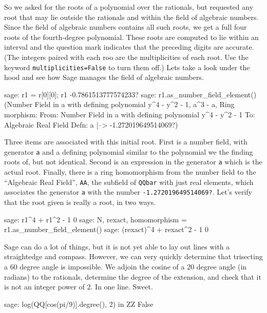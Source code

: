 %
So we asked for the roots of a polynomial over the rationals, but requested any root that may lie outside the rationals and within the field of algebraic numbers.  Since the field of algebraic numbers contains all such roots, we get a full four roots of the fourth-degree polynomial.  These roots are computed to lie within an interval and the question mark indicates that the preceding digits are accurate.  (The integers paired with each roo are the multiplicities of each root. Use the keyword \verb?multiplicities=False? to turn them off.)  Lets take a look under the hood and see how Sage manages the field of algebraic numbers.
%
\begin{sageexample}
sage: r1 = r[0][0]; r1
-0.7861513777574233?
sage: r1.as_number_field_element()
(Number Field in a with defining polynomial y^4 - y^2 - 1,
 a^3 - a,
 Ring morphism:
   From: Number Field in a with defining polynomial y^4 - y^2 - 1
   To:   Algebraic Real Field
   Defn: a |--> -1.272019649514069?)
\end{sageexample}
%
Three items are associated with this initial root.  First is a number field, with generator \verb?a? and a defining polynomial similar to the polynomial we the finding roots of, but not identical.  Second is an expression in the generator \verb?a? which is the actual root.  Finally, there is a ring homomorphism from the number field to the ``Algebraic Real Field'', \verb?AA?, the subfield of \verb?QQbar? with just real elements, which associates the generator \verb?a? with the number \verb!-1.272019649514069?!.  Let's verify that the root given is really a root, in two ways.
%
\begin{sageexample}
sage: r1^4 + r1^2 - 1
0
sage: N, rexact, homomorphism = r1.as_number_field_element()
sage: (rexact)^4 + rexact^2 - 1
0
\end{sageexample}
%
%
Sage can do a lot of things, but it is not yet able to lay out lines with a straightedge and compass.  However, we can very quickly determine that trisecting a 60 degree angle is impossible.  We adjoin the cosine of a 20 degree angle (in radians) to the rationals, determine the degree of the extension, and check that it is not an integer power of 2.  In one line.  Sweet.
%
\begin{sageexample}
sage: log(QQ[cos(pi/9)].degree(), 2) in ZZ
False
\end{sageexample}
%

